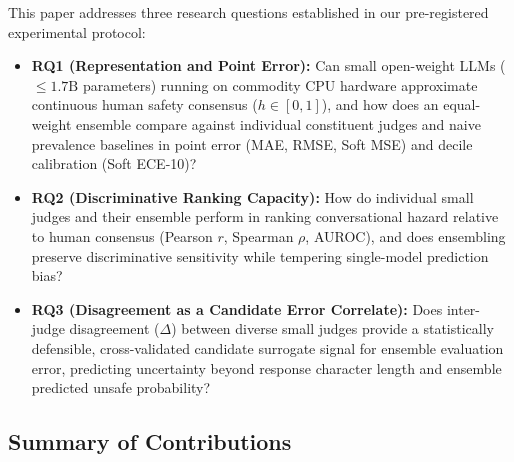 This paper addresses three research questions established in our pre-registered experimental protocol:
\begin{itemize}
    \item \textbf{RQ1 (Representation and Point Error):} Can small open-weight LLMs ($\le 1.7\text{B}$ parameters) running on commodity CPU hardware approximate continuous human safety consensus ($h \in [0, 1]$), and how does an equal-weight ensemble compare against individual constituent judges and naive prevalence baselines in point error (MAE, RMSE, Soft MSE) and decile calibration (Soft ECE-10)?
    \item \textbf{RQ2 (Discriminative Ranking Capacity):} How do individual small judges and their ensemble perform in ranking conversational hazard relative to human consensus (Pearson $r$, Spearman $\rho$, AUROC), and does ensembling preserve discriminative sensitivity while tempering single-model prediction bias?
    \item \textbf{RQ3 (Disagreement as a Candidate Error Correlate):} Does inter-judge disagreement ($\Delta$) between diverse small judges provide a statistically defensible, cross-validated candidate surrogate signal for ensemble evaluation error, predicting uncertainty beyond response character length and ensemble predicted unsafe probability?
\end{itemize}

\subsection{Summary of Contributions}
\label{sec:contributions}

